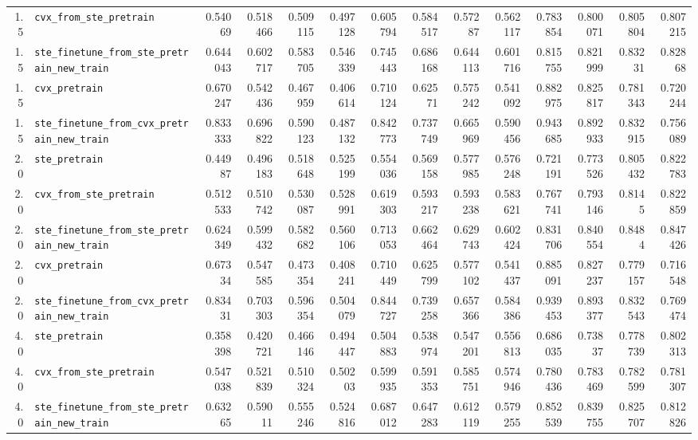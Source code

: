 \begin{longtable}{@{}r l *{12}{r}@{}}
1.5 & \texttt{cvx\_from\_ste\_pretrain} & 0.54069 & 0.518466 & 0.509115 & 0.497128 & 0.605794 & 0.584517 & 0.57287 & 0.562117 & 0.783854 & 0.800071 & 0.805804 & 0.807215 \\
1.5 & \texttt{ste\_finetune\_from\_ste\_pretrain\_new\_train} & 0.644043 & 0.602717 & 0.583705 & 0.546339 & 0.745443 & 0.686168 & 0.644113 & 0.601716 & 0.815755 & 0.821999 & 0.83231 & 0.82868 \\
1.5 & \texttt{cvx\_pretrain} & 0.670247 & 0.542436 & 0.467959 & 0.406614 & 0.710124 & 0.62571 & 0.575242 & 0.541092 & 0.882975 & 0.825817 & 0.781343 & 0.720244 \\
1.5 & \texttt{ste\_finetune\_from\_cvx\_pretrain\_new\_train} & 0.833333 & 0.696822 & 0.590123 & 0.487132 & 0.842773 & 0.737749 & 0.665969 & 0.590456 & 0.943685 & 0.892933 & 0.832915 & 0.756089 \\
2.0 & \texttt{ste\_pretrain} & 0.44987 & 0.496183 & 0.518648 & 0.525199 & 0.554036 & 0.569158 & 0.577985 & 0.576248 & 0.721191 & 0.773526 & 0.805432 & 0.822783 \\
2.0 & \texttt{cvx\_from\_ste\_pretrain} & 0.512533 & 0.510742 & 0.530087 & 0.528991 & 0.619303 & 0.593217 & 0.593238 & 0.583621 & 0.767741 & 0.793146 & 0.8145 & 0.822859 \\
2.0 & \texttt{ste\_finetune\_from\_ste\_pretrain\_new\_train} & 0.624349 & 0.599432 & 0.582682 & 0.560106 & 0.713053 & 0.662464 & 0.629743 & 0.602424 & 0.831706 & 0.840554 & 0.8484 & 0.847426 \\
2.0 & \texttt{cvx\_pretrain} & 0.67334 & 0.547585 & 0.473354 & 0.408241 & 0.710449 & 0.625799 & 0.577102 & 0.541437 & 0.885091 & 0.827237 & 0.779157 & 0.716548 \\
2.0 & \texttt{ste\_finetune\_from\_cvx\_pretrain\_new\_train} & 0.83431 & 0.703303 & 0.596354 & 0.504079 & 0.844727 & 0.739258 & 0.657366 & 0.584386 & 0.939453 & 0.893377 & 0.832543 & 0.769474 \\
4.0 & \texttt{ste\_pretrain} & 0.358398 & 0.420721 & 0.466146 & 0.494447 & 0.504883 & 0.538974 & 0.547201 & 0.556813 & 0.686035 & 0.73837 & 0.778739 & 0.802313 \\
4.0 & \texttt{cvx\_from\_ste\_pretrain} & 0.547038 & 0.521839 & 0.510324 & 0.50203 & 0.599935 & 0.591353 & 0.585751 & 0.574946 & 0.780436 & 0.783469 & 0.782599 & 0.781307 \\
4.0 & \texttt{ste\_finetune\_from\_ste\_pretrain\_new\_train} & 0.63265 & 0.59011 & 0.555246 & 0.524816 & 0.687012 & 0.647283 & 0.612119 & 0.579255 & 0.852539 & 0.839755 & 0.825707 & 0.812826 \\

\end{longtable}
